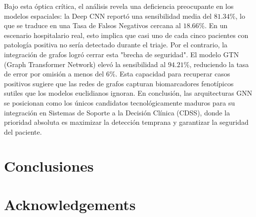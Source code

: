 \documentclass[review,12pt,times,number]{elsarticle}
\begin{document}
Bajo esta óptica crítica, el análisis revela una deficiencia preocupante en los modelos espaciales: la Deep CNN reportó una sensibilidad media del $81.34\%$, lo que se traduce en una Tasa de Falsos Negativos cercana al $18.66\%$. En un escenario hospitalario real, esto implica que casi uno de cada cinco pacientes con patología positiva no sería detectado durante el triaje. Por el contrario, la integración de grafos logró cerrar esta "brecha de seguridad". El modelo GTN (Graph Transformer Network) elevó la sensibilidad al $94.21\%$, reduciendo la tasa de error por omisión a menos del $6\%$. Esta capacidad para recuperar casos positivos sugiere que las redes de grafos capturan biomarcadores fenotípicos sutiles que los modelos euclidianos ignoran. En conclusión, las arquitecturas GNN se posicionan como los únicos candidatos tecnológicamente maduros para su integración en Sistemas de Soporte a la Decisión Clínica (CDSS), donde la prioridad absoluta es maximizar la detección temprana y garantizar la seguridad del paciente.

\section{Conclusiones}


\section*{Acknowledgements}


\appendix



 







\end{document}
